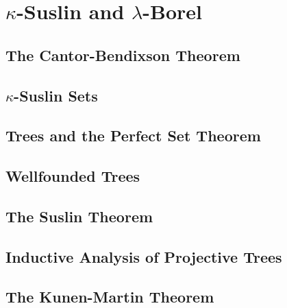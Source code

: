 \documentclass[openany]{book}
\begin{document}
\chapter{$\kappa$-Suslin and $\lambda$-Borel}

\section{The Cantor-Bendixson Theorem}

\section{$\kappa$-Suslin Sets}

\section{Trees and the Perfect Set Theorem}

\section{Wellfounded Trees}

\section{The Suslin Theorem}

\section{Inductive Analysis of Projective Trees}

\section{The Kunen-Martin Theorem}
\end{document}
